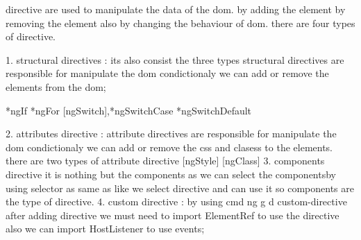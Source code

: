 directive are used to manipulate the data of the dom.
by adding the element by removing the element also by changing the behaviour of dom.
 there are four types of directive.


 1. structural directives : its also consist the three types 
 structural directives are responsible for manipulate the dom 
 condictionaly we can add or remove the elements from the dom;

 *ngIf
 *ngFor
 [ngSwitch],*ngSwitchCase *ngSwitchDefault
 
 2. attributes directive :
 attribute directives are responsible for manipulate the dom 
 condictionaly we can add or remove the css and clasess to the elements.
 there are two types of attribute directive
 [ngStyle]
 [ngClass]
 3. components directive 
 it is nothing but the components as we can select the componentsby using selector as same as like we select directive and can use it so components are the type of directive.
 4. custom directive :
  by using cmd
  ng g d custom-directive
  after adding directive we must need to import 
  ElementRef to use the directive
  also we can import 
  HostListener to use events;

  

